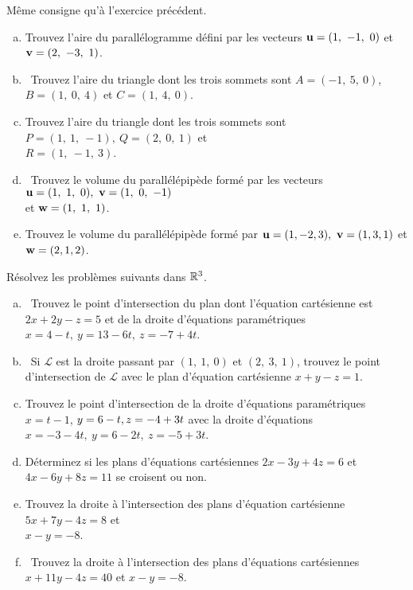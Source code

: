 \begin{prob}
\label{prob03.2}  Même consigne qu'à l'exercice précédent. \medskip
\begin{enumerate}[a)]

\item Trouvez l'aire du parallélogramme défini par les vecteurs
$\mathbf{u}=(1,\ -1,\ 0)$ et $\mathbf{v}=(2,\ -3,\ 1)$.    \medskip
\item\sov~Trouvez l'aire du triangle dont les trois sommets sont $ A=(-1,\ 5,\ 0) $, $B=(1,\ 0,\ 4)$ et $C=(1,\ 4,\ 0)$.  \medskip
\item Trouvez l'aire du triangle dont les trois sommets sont $P=(1,\ 1,\ -1),\ Q=(2,\ 0,\ 1)$ et\\ $R=(1,\ -1,\ 3)$.  \medskip


\item\sov~Trouvez le volume du parallélépipède formé par les vecteurs $\uu=(1,\ 1,\ 0),\ \vv=(1,\ 0,\ -1)$\\ et $\mathbf{w}=(1,\ 1,\ 1)$.\medskip

\item Trouvez le volume du parallélépipède formé par $\mathbf{u}=(1, -2, 3),\ \mathbf{v}=(1,3,1)$ et $\mathbf{w}=(2,1,2)$.\medskip

\end{enumerate}



\end{prob} \begin{prob} \label{prob03.3}  Résolvez les problèmes suivants dans $\mathbb{R}^3$. \medskip
\begin{enumerate}[a)]
\item\sov~Trouvez le point d'intersection du plan dont l'équation cartésienne est $2x+2y-z=5$ 
et de la droite d'équations paramétriques $x=4-t,\ y=13-6t,\ z=-7+4t$.\medskip %
\item\sov~Si $\mathcal L$ est la droite passant par $(1,\ 1,\ 0)$ et $(2,\ 3,\ 1)$, trouvez le point d'intersection de $\mathcal L$ avec le plan d'équation cartésienne $x+y-z=1$.\medskip %
\item Trouvez le point d'intersection de la droite d'équations paramétriques $x=t-1$, $y=6-t,\\ z=-4+3t$ avec la droite d'équations $x=-3- 4t,\ y=6-2t,\ z=-5+3t$. \medskip%
\item Déterminez si les plans d'équations cartésiennes $2x-3y+4z=6$ et $4x-6y+8z=11$ se croisent ou non. \medskip%
\item Trouvez la droite à l'intersection des plans d'équation cartésienne $5x+7y-4z=8$ et\\ $x-y=-8$. \medskip%
\item\sov~Trouvez la droite à l'intersection des plans d'équations cartésiennes $x+11y-4z=40$ et $x -y=-8$. \medskip


\end{enumerate}
\end{prob}
